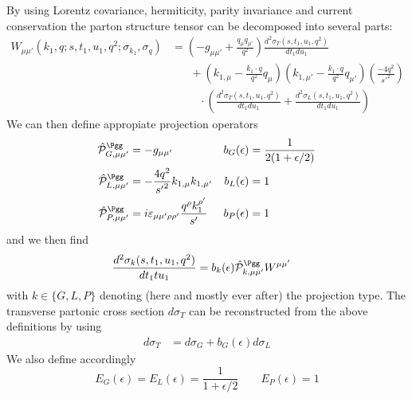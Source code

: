 By using Lorentz covariance, hermiticity, parity invariance and current conservation the parton structure tensor can be decomposed into several parts:
\begin{align}
W_{\mu\mu'}(k_1,q;s,t_1,u_1,q^2;\sigma_{k_1},\sigma_{q}) &= \left(-g_{\mu\mu'} + \frac{q_\mu q_{\mu'}}{q^2}\right)\frac{d^2\sigma_T(s,t_1,u_1,q^2)}{dt_1du_1} \nonumber\\
 &\hspace{20pt} +\left(k_{1,\mu}-\frac{k_1\cdot q}{q^2}q_\mu\right)\left(k_{1,\mu'}-\frac{k_1\cdot q}{q^2}q_{\mu'}\right)\left(\frac{-4q^2}{{s'}^2}\right) \nonumber\\
 &\hspace{30pt} \cdot\left(\frac{d^2\sigma_T(s,t_1,u_1,q^2)}{dt_1du_1}+\frac{d^2\sigma_L(s,t_1,u_1,q^2)}{dt_1du_1}\right)
\end{align}
We can then define appropiate projection operators\cite{Laenen1993162,Vogelsang:1993eg}
\begin{align}
\hat {\mathcal P}^{\Pgg}_{G,\mu\mu'} &= -g_{\mu\mu'} &b_G(\epsilon) &= \frac 1 {2(1+\epsilon/2)}\\
\hat {\mathcal P}^{\Pgg}_{L,\mu\mu'} &= -\frac{4q^2}{{s'}^2} k_{1,\mu}k_{1,\mu'} &b_L(\epsilon) &= 1\\
\hat {\mathcal P}^{\Pgg}_{P,\mu\mu'} &= i\varepsilon_{\mu\mu'\rho\rho'}\frac{q^{\rho}k_1^{\rho'}}{s'} &b_P(\epsilon) &= 1
\end{align}
 and we then find
\begin{align}
\frac{d^2\sigma_{k}(s,t_1,u_1,q^2)}{dt_1tu_1} &= b_k(\epsilon)\hat {\mathcal P}^{\Pgg}_{k,\mu\mu'}W^{\mu\mu'}
\end{align}
with $k\in\{G,L,P\}$ denoting (here and mostly ever after) the projection type. The transverse partonic cross section $d\sigma_T$ can be reconstructed from the above definitions by using
\begin{align}
d\sigma_T &= d\sigma_G + b_G(\epsilon)d\sigma_L
\end{align}
We also define accordingly
\begin{equation}
E_G(\epsilon) = E_L(\epsilon) = \frac 1 {1+\epsilon/2} \qquad E_P(\epsilon) = 1
\end{equation}

